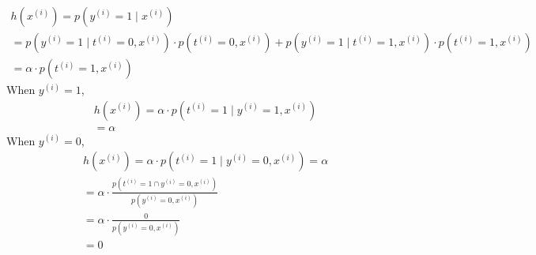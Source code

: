 \begin{answer}
\begin{eqnarray*}
h(x^{(i)})=p(y^{(i)}=1\mid x^{(i)})\\
=p(y^{(i)}=1\mid t^{(i)}=0,x^{(i)})\cdot p(t^{(i)}=0,x^{(i)})+p(y^{(i)}=1\mid t^{(i)}=1,x^{(i)})\cdot p(t^{(i)}=1,x^{(i)})\\
=\alpha\cdot p(t^{(i)}=1,x^{(i)})
\end{eqnarray*}
When $y^{(i)}=1$,
\begin{eqnarray*}
h(x^{(i)})=\alpha\cdot p(t^{(i)}=1\mid y^{(i)}=1,x^{(i)})\\
=\alpha
\end{eqnarray*}
When $y^{(i)}=0$,
\begin{eqnarray*}
h(x^{(i)})=\alpha\cdot p(t^{(i)}=1\mid y^{(i)}=0,x^{(i)})=\alpha\\
=\alpha\cdot\frac{p(t^{(i)}=1 \cap y^{(i)}=0,x^{(i)})}{p(y^{(i)}=0,x^{(i)})}\\
=\alpha\cdot\frac{0}{p(y^{(i)}=0,x^{(i)})}\\
=0
\end{eqnarray*}
\end{answer}
